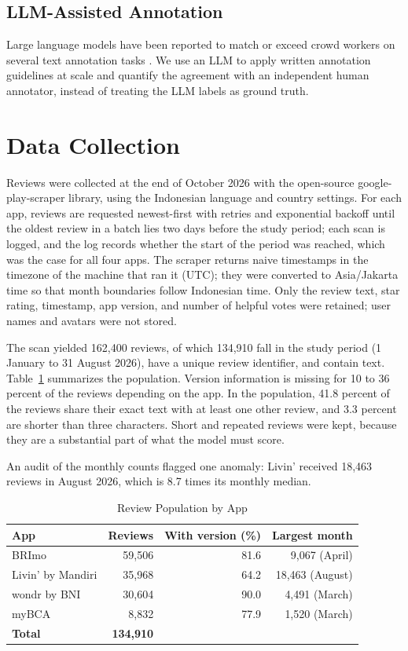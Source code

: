 \documentclass[conference]{IEEEtran}
\begin{document}
\subsection{LLM-Assisted Annotation}
Large language models have been reported to match or exceed crowd workers on several text annotation tasks \cite{b12}. We use an LLM to apply written annotation guidelines at scale and quantify the agreement with an independent human annotator, instead of treating the LLM labels as ground truth.

\section{Data Collection}\label{sec:data}
Reviews were collected at the end of October 2026 with the open-source google-play-scraper library, using the Indonesian language and country settings. For each app, reviews are requested newest-first with retries and exponential backoff until the oldest review in a batch lies two days before the study period; each scan is logged, and the log records whether the start of the period was reached, which was the case for all four apps. The scraper returns naive timestamps in the timezone of the machine that ran it (UTC); they were converted to Asia/Jakarta time so that month boundaries follow Indonesian time. Only the review text, star rating, timestamp, app version, and number of helpful votes were retained; user names and avatars were not stored.

The scan yielded 162,400 reviews, of which 134,910 fall in the study period (1 January to 31 August 2026), have a unique review identifier, and contain text. Table~\ref{tab:population} summarizes the population. Version information is missing for 10 to 36 percent of the reviews depending on the app. In the population, 41.8 percent of the reviews share their exact text with at least one other review, and 3.3 percent are shorter than three characters. Short and repeated reviews were kept, because they are a substantial part of what the model must score.

An audit of the monthly counts flagged one anomaly: Livin' received 18,463 reviews in August 2026, which is 8.7 times its monthly median.

\begin{table}[htbp]
\caption{Review Population by App}
\begin{center}
\footnotesize
\begin{tabular}{|l|r|r|r|}
\hline
\textbf{App} & \textbf{Reviews} & \textbf{With version (\%)} & \textbf{Largest month} \\
\hline
BRImo & 59,506 & 81.6 & 9,067 (April) \\
Livin' by Mandiri & 35,968 & 64.2 & 18,463 (August) \\
wondr by BNI & 30,604 & 90.0 & 4,491 (March) \\
myBCA & 8,832 & 77.9 & 1,520 (March) \\
\hline
\textbf{Total} & \textbf{134,910} & & \\
\hline
\end{tabular}
\label{tab:population}
\end{center}
\end{table}
\end{document}
